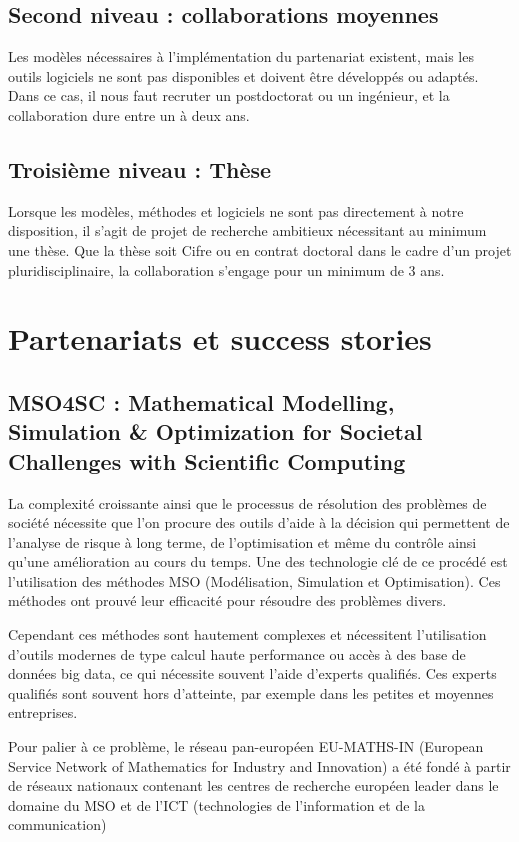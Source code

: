 \documentclass[12pt,a4paper]{article}
\begin{document}
\subsection*{Second niveau : collaborations moyennes}
Les modèles nécessaires à l'implémentation du partenariat existent, mais les outils logiciels ne sont pas disponibles et doivent être développés ou adaptés. Dans ce cas, il nous faut recruter un postdoctorat ou un ingénieur, et la collaboration dure entre un à deux ans.
\subsection*{Troisième niveau : Thèse}
Lorsque les modèles, méthodes et logiciels ne sont pas directement à notre disposition, il s'agit de projet de recherche ambitieux nécessitant au minimum une thèse. Que la thèse soit Cifre ou en contrat doctoral dans le cadre d'un projet pluridisciplinaire, la collaboration s'engage pour un minimum de 3 ans.
\section*{Partenariats et success stories}
\subsection*{MSO4SC : Mathematical Modelling, Simulation \& Optimization for Societal Challenges with Scientific Computing}

La complexité croissante ainsi que le processus de résolution des problèmes de société nécessite que l'on procure des outils d'aide à la décision qui permettent de l'analyse de risque à long terme, de l'optimisation et même du contrôle ainsi qu'une amélioration au cours du temps.
Une des technologie clé de ce procédé est l'utilisation des méthodes MSO (Modélisation, Simulation et Optimisation). Ces méthodes ont prouvé leur efficacité pour résoudre des problèmes divers.

Cependant ces méthodes sont hautement complexes et nécessitent l'utilisation d'outils modernes de type calcul haute performance ou accès à des base de données big data, ce qui nécessite souvent l'aide d'experts qualifiés. Ces experts qualifiés sont souvent hors d'atteinte, par exemple dans les petites et moyennes entreprises.

Pour palier à ce problème, le réseau pan-européen EU-MATHS-IN (European Service Network of Mathematics for Industry and Innovation) a été fondé à partir de réseaux nationaux contenant les centres de recherche européen leader dans le domaine du MSO et de l'ICT (technologies de l'information et de la communication)
\end{document}
